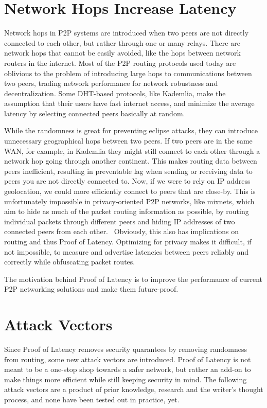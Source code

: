
\section{Network Hops Increase Latency}
Network hops in P2P systems are introduced when two peers are not directly connected to each other, but rather through one or many relays. There are network hops that cannot be easily avoided, like the hops between network routers in the internet. Most of the P2P routing protocols used today are oblivious to the problem of introducing large hops to communications between two peers, trading network performance for network robustness and decentralization. Some DHT-based protocols, like Kademlia, make the assumption that their users have fast internet access, and minimize the average latency by selecting connected peers basically at random.

While the randomness is great for preventing eclipse attacks, they can introduce unnecessary geographical hops between two peers. If two peers are in the same WAN, for example, in Kademlia they might still connect to each other through a network hop going through another continent. This makes routing data between peers inefficient, resulting in preventable lag when sending or receiving data to peers you are not directly connected to.
Now, if we were to rely on IP address geolocation, we could more efficiently connect to peers that are close-by. This is unfortunately impossible in privacy-oriented P2P networks, like mixnets, which aim to hide as much of the packet routing information as possible, by routing individual packets through different peers and hiding IP addresses of two connected peers from each other.~\cite{Harry_Halpin_undated-sq} Obviously, this also has implications on routing and thus Proof of Latency. Optimizing for privacy makes it difficult, if not impossible, to measure and advertise latencies between peers reliably and correctly while obfuscating packet routes.

The motivation behind Proof of Latency is to improve the performance of current P2P networking solutions and make them future-proof.

\section{Attack Vectors}
Since Proof of Latency removes security quarantees by removing randomness from routing, some new attack vectors are introduced. Proof of Latency is not meant to be a one-stop shop towards a safer network, but rather an add-on to make things more efficient while still keeping security in mind. The following attack vectors are a product of prior knowledge, research and the writer's thought process, and none have been tested out in practice, yet.

